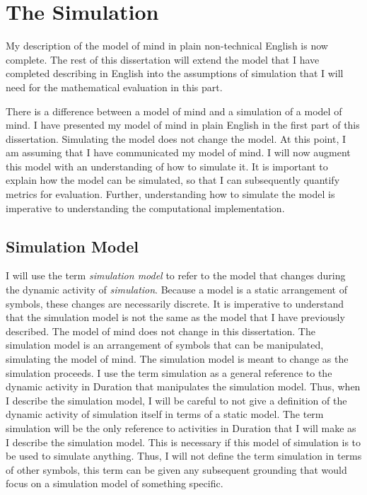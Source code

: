 \chapter{The Simulation}
\label{chapter:the_simulation}

My description of the model of mind in plain non-technical English is
now complete.  The rest of this dissertation will extend the model
that I have completed describing in English into the assumptions of
simulation that I will need for the mathematical evaluation in this
part.

There is a difference between a model of mind and a simulation of a
model of mind.  I have presented my model of mind in plain English in
the first part of this dissertation.  Simulating the model does not
change the model.  At this point, I am assuming that I have
communicated my model of mind.  I will now augment this model with an
understanding of how to simulate it.  It is important to explain how
the model can be simulated, so that I can subsequently quantify
metrics for evaluation.  Further, understanding how to simulate the
model is imperative to understanding the computational implementation.

\section{Simulation Model}

I will use the term \emph{simulation model} to refer to the model that
changes during the dynamic activity of \emph{simulation}.  Because a
model is a static arrangement of symbols, these changes are
necessarily discrete.  It is imperative to understand that the
simulation model is not the same as the model that I have previously
described.  The model of mind does not change in this dissertation.
The simulation model is an arrangement of symbols that can be
manipulated, simulating the model of mind.  The simulation model is
meant to change as the simulation proceeds.  I use the term simulation
as a general reference to the dynamic activity in Duration that
manipulates the simulation model.  Thus, when I describe the
simulation model, I will be careful to not give a definition of the
dynamic activity of simulation itself in terms of a static model.  The
term simulation will be the only reference to activities in Duration
that I will make as I describe the simulation model.  This is
necessary if this model of simulation is to be used to simulate
anything.  Thus, I will not define the term simulation in terms of
other symbols, this term can be given any subsequent grounding that
would focus on a simulation model of something specific.

